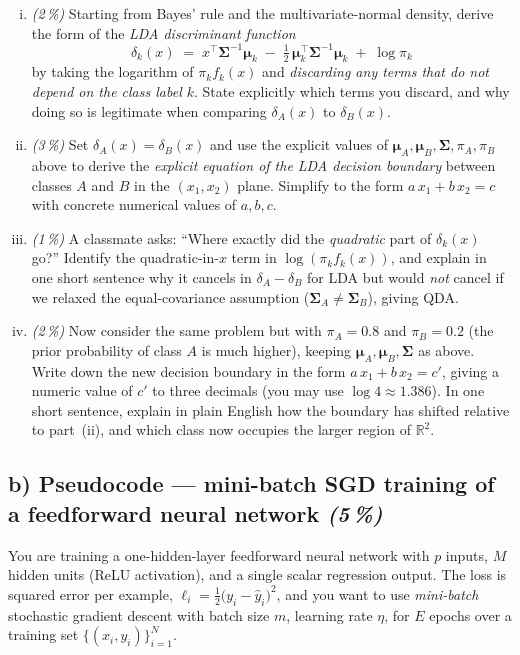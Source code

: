 \documentclass[11pt,a4paper]{article}
\newcommand{\subpoints}[1]{\textit{(#1\,\%)}}
\begin{document}
\begin{enumerate}[(i)]
  \item \subpoints{2} Starting from Bayes' rule and the multivariate-normal density, derive the form of the \emph{LDA discriminant function}
  $$\delta_k(x) \;=\; x^\top \bm\Sigma^{-1} \bm\mu_k \;-\; \tfrac{1}{2}\,\bm\mu_k^\top \bm\Sigma^{-1} \bm\mu_k \;+\; \log \pi_k$$
  by taking the logarithm of $\pi_k f_k(x)$ and \emph{discarding any terms that do not depend on the class label $k$}. State explicitly which terms you discard, and why doing so is legitimate when comparing $\delta_A(x)$ to $\delta_B(x)$.

  \item \subpoints{3} Set $\delta_A(x) = \delta_B(x)$ and use the explicit values of $\bm\mu_A, \bm\mu_B, \bm\Sigma, \pi_A, \pi_B$ above to derive the \emph{explicit equation of the LDA decision boundary} between classes $A$ and $B$ in the $(x_1, x_2)$ plane. Simplify to the form $a\,x_1 + b\,x_2 = c$ with concrete numerical values of $a, b, c$.

  \item \subpoints{1} A classmate asks: ``Where exactly did the \emph{quadratic} part of $\delta_k(x)$ go?'' Identify the quadratic-in-$x$ term in $\log(\pi_k f_k(x))$, and explain in one short sentence why it cancels in $\delta_A - \delta_B$ for LDA but would \emph{not} cancel if we relaxed the equal-covariance assumption ($\bm\Sigma_A \neq \bm\Sigma_B$), giving QDA.

  \item \subpoints{2} Now consider the same problem but with $\pi_A = 0.8$ and $\pi_B = 0.2$ (the prior probability of class $A$ is much higher), keeping $\bm\mu_A, \bm\mu_B, \bm\Sigma$ as above. Write down the new decision boundary in the form $a\,x_1 + b\,x_2 = c'$, giving a numeric value of $c'$ to three decimals (you may use $\log 4 \approx 1.386$). In one short sentence, explain in plain English how the boundary has shifted relative to part~(ii), and which class now occupies the larger region of $\mathbb{R}^2$.
\end{enumerate}

\subsection*{b) Pseudocode --- mini-batch SGD training of a feedforward neural network \subpoints{5}}

You are training a one-hidden-layer feedforward neural network with $p$ inputs, $M$ hidden units (ReLU activation), and a single scalar regression output. The loss is squared error per example, $\ell_i = \tfrac{1}{2}\bigl(y_i - \hat y_i\bigr)^2$, and you want to use \emph{mini-batch} stochastic gradient descent with batch size $m$, learning rate $\eta$, for $E$ epochs over a training set $\{(x_i, y_i)\}_{i=1}^{N}$.
\end{document}
